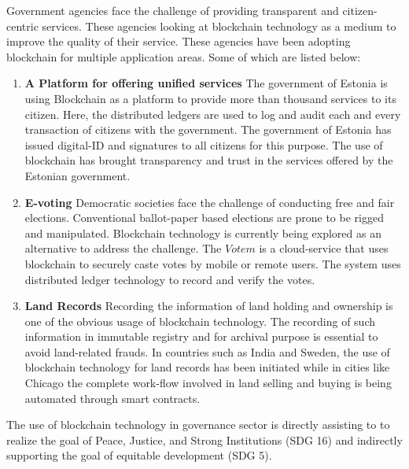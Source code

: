 \documentclass[10pt]{IETBook}
\begin{document}
Government agencies face the challenge of providing transparent and citizen-centric services. 
These agencies looking at blockchain technology as a medium to improve the quality of their service.
These agencies have been adopting blockchain for multiple application areas. Some of which are listed below:
\begin{enumerate}
    \item {\bf A Platform for offering unified services} The government of Estonia is using Blockchain as a platform to provide more than thousand services to its citizen. Here, the distributed ledgers are used to log and  audit each and every transaction of citizens with the government. The government of Estonia has issued digital-ID and signatures to all citizens for this purpose. The use of blockchain has brought transparency and trust in the services offered by the Estonian government.
    \item{\bf  E-voting} Democratic societies face the challenge of conducting free and fair elections. Conventional  ballot-paper based elections are prone to be rigged and manipulated. Blockchain technology is currently being explored as an alternative to address the challenge. The $Votem$ is a cloud-service that uses blockchain to securely caste votes by mobile or remote users. The system uses distributed ledger technology to record and verify the votes. 
    \item {\bf Land Records} Recording the information of land holding and ownership is one of the obvious usage of blockchain technology. The recording of such information in immutable registry and for archival purpose is essential to  avoid land-related frauds. In countries such as India and Sweden, the use of blockchain technology for land records has been initiated while in cities like Chicago the complete work-flow involved in land selling and buying is being automated through smart contracts.
\end{enumerate}

The use of blockchain technology in governance sector is directly assisting to to realize the goal of Peace, Justice, and Strong Institutions (SDG 16) and indirectly supporting the goal of equitable development (SDG 5).
 
\end{document}
